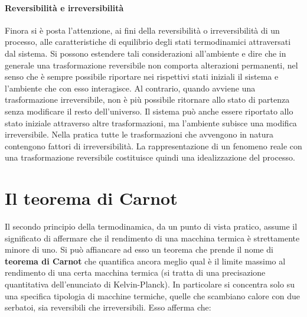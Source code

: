 \documentclass[10pt,a4paper]{book}
\begin{document}
\paragraph{Reversibilità e irreversibilità} Finora si è posta l'attenzione, ai fini della reversibilità o irreversibilità di un processo, alle caratteristiche di equilibrio degli stati termodinamici attraversati dal sistema. Si possono estendere tali considerazioni all'ambiente e dire che in generale una trasformazione reversibile non comporta alterazioni permanenti, nel senso che è sempre possibile riportare nei rispettivi stati iniziali il sistema e l'ambiente che con esso interagisce. Al contrario, quando avviene una trasformazione irreversibile, non è più possibile ritornare allo stato di partenza senza modificare il resto dell'universo. Il sistema può anche essere riportato allo stato iniziale attraverso altre trasformazioni, ma l'ambiente subisce una modifica irreversibile. Nella pratica tutte le trasformazioni che avvengono in natura contengono fattori di irreversibilità. La rappresentazione di un fenomeno reale con una trasformazione reversibile costituisce quindi una idealizzazione del processo.







































\section{Il teorema di Carnot}

Il secondo principio della termodinamica, da un punto di vista pratico, assume il significato di affermare che il rendimento di una macchina termica è strettamente minore di uno. Si può affiancare ad esso un teorema che prende il nome di \textbf{teorema di Carnot} che quantifica ancora meglio qual è il limite massimo al rendimento di una certa macchina termica (si tratta di una precisazione quantitativa dell'enunciato di Kelvin-Planck). In particolare si concentra solo su una specifica tipologia di macchine termiche, quelle che scambiano calore con due serbatoi, sia reversibili che irreversibili. Esso afferma che:
\end{document}
